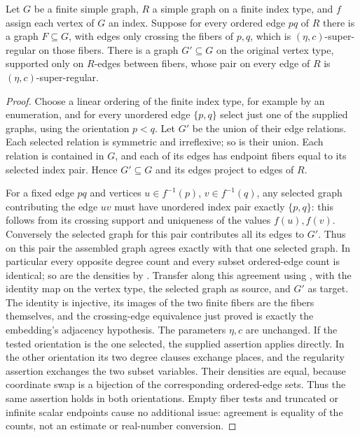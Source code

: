\begin{lemma}
Let $G$ be a finite simple graph, $R$ a simple graph on a finite index
type, and $f$ assign each vertex of $G$ an index. Suppose for every
ordered edge $pq$ of $R$ there is a graph $F\subseteq G$, with
edges only crossing the fibers of $p,q$, which is
$(\eta,c)$-super-regular on those fibers. There is a graph
$G'\subseteq G$ on the original vertex type, supported only on
$R$-edges between fibers, whose pair on every edge of $R$ is
$(\eta,c)$-super-regular.
\end{lemma}
\begin{proof}
Choose a linear ordering of the finite index type, for example by
an enumeration, and for every unordered edge $\{p,q\}$ select just
one of the supplied graphs, using the orientation $p<q$.
Let $G'$ be the union of their edge relations. Each selected relation
is symmetric and irreflexive; so is their union. Each relation is
contained in $G$, and each of its edges has endpoint fibers equal
to its selected index pair. Hence $G'\subseteq G$ and its edges
project to edges of $R$.

For a fixed edge $pq$ and vertices $u\in f^{-1}(p)$,
$v\in f^{-1}(q)$, any selected graph contributing the edge $uv$
must have unordered index pair exactly $\{p,q\}$: this follows
from its crossing support and uniqueness of the values $f(u),f(v)$.
Conversely the selected graph for this pair contributes all its
edges to $G'$. Thus on this pair the assembled graph agrees
exactly with that one selected graph. In particular every opposite
degree count and every subset ordered-edge count is identical;
so are the densities by . Transfer along this
agreement using , with the identity
map on the vertex type, the selected graph as source, and $G'$ as target.
The identity is injective, its images of the two finite fibers are
the fibers themselves, and the crossing-edge equivalence just proved
is exactly the embedding's adjacency hypothesis. The parameters
$\eta,c$ are unchanged. If the tested
orientation is the one selected, the supplied
 assertion applies directly. In the other
orientation its two degree clauses exchange places, and the
regularity assertion exchanges the two subset variables. Their
densities are equal, because coordinate swap is a bijection of
the corresponding ordered-edge sets. Thus the same assertion holds
in both orientations. Empty fiber tests and truncated or infinite
scalar endpoints cause no additional issue: agreement is equality
of the counts, not an estimate or real-number conversion.
\end{proof}
